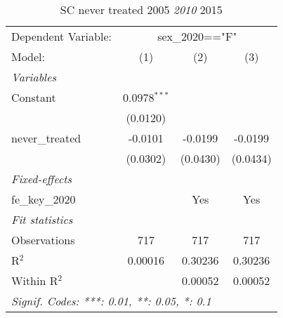 
\begin{table}[htbp]
   \caption{SC never treated 2005 \textit{ 2010 } 2015}
   \centering
   \begin{tabular}{lccc}
      \tabularnewline \midrule \midrule
      Dependent Variable: & \multicolumn{3}{c}{sex\_2020=="F"}\\
      Model:          & (1)            & (2)      & (3)\\  
      \midrule
      \emph{Variables}\\
      Constant        & 0.0978$^{***}$ &          &   \\   
                      & (0.0120)       &          &   \\   
      never\_treated  & -0.0101        & -0.0199  & -0.0199\\   
                      & (0.0302)       & (0.0430) & (0.0434)\\   
      \midrule
      \emph{Fixed-effects}\\
      fe\_key\_2020   &                & Yes      & Yes\\  
      \midrule
      \emph{Fit statistics}\\
      Observations    & 717            & 717      & 717\\  
      R$^2$           & 0.00016        & 0.30236  & 0.30236\\  
      Within R$^2$    &                & 0.00052  & 0.00052\\  
      \midrule \midrule
      \multicolumn{4}{l}{\emph{Signif. Codes: ***: 0.01, **: 0.05, *: 0.1}}\\
   \end{tabular}
\end{table}


